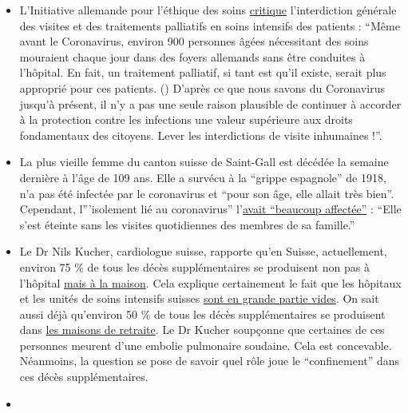 \begin{itemize}
\item
  L'Initiative allemande pour l'éthique des soins
  \href{http://pflegeethik-initiative.de/2020/04/15/corona-krise-falsche-prioritaeten-gesetzt-und-ethische-prinzipien-verletzt/}{critique}
  l'interdiction générale des visites et des traitements palliatifs en
  soins intensifs des patients : ``Même avant le Coronavirus, environ
  900 personnes âgées nécessitant des soins mouraient chaque jour dans
  des foyers allemands sans être conduites à l'hôpital. En fait, un
  traitement palliatif, si tant est qu'il existe, serait plus approprié
  pour ces patients. () D'après ce que nous savons du Coronavirus
  jusqu'à présent, il n'y a pas une seule raison plausible de continuer
  à accorder à la protection contre les infections une valeur supérieure
  aux droits fondamentaux des citoyens. Lever les interdictions de
  visite inhumaines !''.
\item
  La plus vieille femme du canton suisse de Saint-Gall est décédée la
  semaine dernière à l'âge de 109 ans. Elle a survécu à la ``grippe
  espagnole'' de 1918, n'a pas été infectée par le coronavirus et ``pour
  son âge, elle allait très bien''. Cependant, l'''isolement lié au
  coronavirus''
  l'\href{https://swprs.files.wordpress.com/2020/04/tagblatt-109.jpg}{avait
  ``beaucoup affectée''} : ``Elle s'est éteinte sans les visites
  quotidiennes des membres de sa famille.''
\item
  Le Dr Nils Kucher, cardiologue suisse, rapporte qu'en Suisse,
  actuellement, environ 75 \% de tous les décès supplémentaires se
  produisent non pas à l'hôpital
  \href{https://www.tagesspiegel.de/wissen/woran-sterben-corona-patienten-wirklich-ein-schweizer-forscher-macht-hoffnung-im-kampf-gegen-covid-19/25750666.html}{mais
  à la maison}. Cela explique certainement le fait que les hôpitaux et
  les unités de soins intensifs suisses
  \href{https://swprs.files.wordpress.com/2020/04/intensivbettenbelegung-schweiz-2020-04-14.png}{sont
  en grande partie vides}. On sait aussi déjà qu'environ 50 \% de tous
  les décès supplémentaires se produisent dans
  \href{https://www.nzz.ch/zuerich/coronavirus-zuerich-aendert-nun-das-testregime-in-heimenauch-viele-aeltere-covid-19-infizierte-entwickeln-keine-symptome-zuerich-aendert-nun-das-testregime-in-heimen-ld.1552089}{les
  maisons de retraite}. Le Dr Kucher soupçonne que certaines de ces
  personnes meurent d'une embolie pulmonaire soudaine. Cela est
  concevable. Néanmoins, la question se pose de savoir quel rôle joue le
  ``confinement'' dans ces décès supplémentaires.
\item

\end{itemize}
